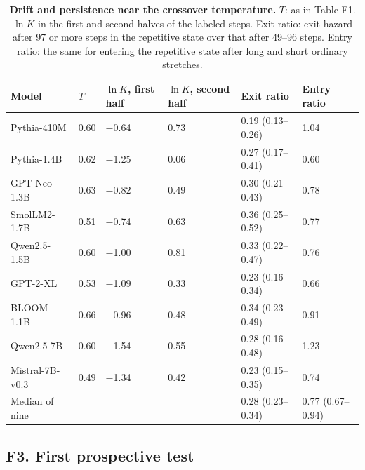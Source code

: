\documentclass[aps,prx,onecolumn,superscriptaddress,longbibliography]{revtex4-2}
\begin{document}
\begin{table}[htbp]
\centering
\small
\setlength{\tabcolsep}{6pt}
\renewcommand{\thetable}{F3}
\caption{\textbf{Drift and persistence near the crossover temperature.} \(T\): as in Table F1. \(\ln K\) in the first and second halves of the labeled steps. Exit ratio: exit hazard after 97 or more steps in the repetitive state over that after 49--96 steps. Entry ratio: the same for entering the repetitive state after long and short ordinary stretches.}
\label{tabF3}
\begin{tabular}{@{}llllll@{}}
\toprule
Model & \(T\) & \(\ln K\), first half & \(\ln K\), second half & Exit ratio & Entry ratio \\
\midrule
Pythia-410M & 0.60 & −0.64 & 0.73 & 0.19 (0.13--0.26) & 1.04 \\
Pythia-1.4B & 0.62 & −1.25 & 0.06 & 0.27 (0.17--0.41) & 0.60 \\
GPT-Neo-1.3B & 0.63 & −0.82 & 0.49 & 0.30 (0.21--0.43) & 0.78 \\
SmolLM2-1.7B & 0.51 & −0.74 & 0.63 & 0.36 (0.25--0.52) & 0.77 \\
Qwen2.5-1.5B & 0.60 & −1.00 & 0.81 & 0.33 (0.22--0.47) & 0.76 \\
GPT-2-XL & 0.53 & −1.09 & 0.33 & 0.23 (0.16--0.34) & 0.66 \\
BLOOM-1.1B & 0.66 & −0.96 & 0.48 & 0.34 (0.23--0.49) & 0.91 \\
Qwen2.5-7B & 0.60 & −1.54 & 0.55 & 0.28 (0.16--0.48) & 1.23 \\
Mistral-7B-v0.3 & 0.49 & −1.34 & 0.42 & 0.23 (0.15--0.35) & 0.74 \\
Median of nine & & & & 0.28 (0.23--0.34) & 0.77 (0.67--0.94) \\
\bottomrule
\end{tabular}
\end{table}


\subsection*{F3. First prospective test}
\end{document}
